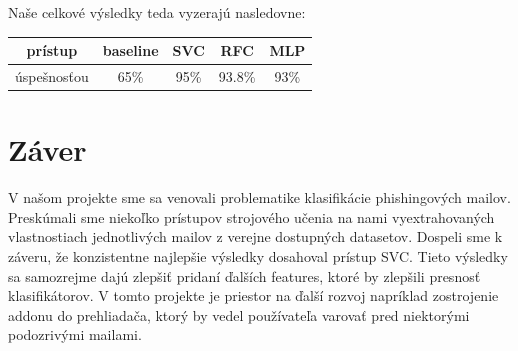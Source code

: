 \documentclass[12pt]{article}
\begin{document}
Naše celkové výsledky teda vyzerajú nasledovne:
\begin{center}
\begin{tabular}{ |c|c|c|c|c| } 
 \hline
  prístup & baseline & SVC & RFC & MLP \\ 
  \hline
  úspešnosťou & 65\% & 95\% & 93.8\% & 93\% \\ 
  
 \hline
\end{tabular}
\end{center}


\section*{Záver}
V našom projekte sme sa venovali problematike klasifikácie phishingových mailov. Preskúmali sme niekoľko prístupov strojového učenia na nami vyextrahovaných vlastnostiach jednotlivých mailov z verejne dostupných datasetov. Dospeli sme k záveru, že konzistentne najlepšie výsledky dosahoval prístup SVC. Tieto výsledky sa samozrejme dajú zlepšiť pridaní ďalších features, ktoré by zlepšili presnosť klasifikátorov. V tomto projekte je priestor na ďalší rozvoj napríklad zostrojenie addonu do prehliadača, ktorý by vedel používateľa varovať pred niektorými podozrivými mailami.
\end{document}
